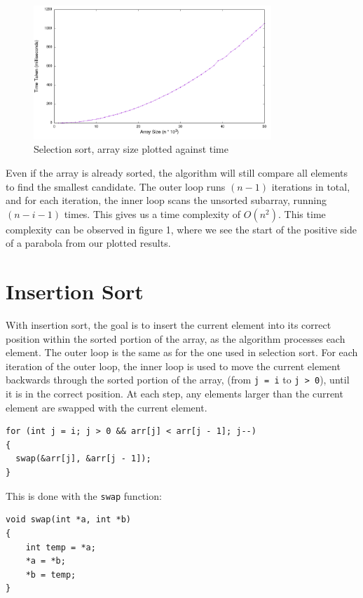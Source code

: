 \documentclass[a4paper,11pt]{article}
\begin{document}
\begin{figure}[h!]
  \centering
  \includegraphics[width=0.8\textwidth]{SelectionSort_plot}
  \caption{Selection sort, array size plotted against time}
  \label{fig:SelectionSort_plot}
\end{figure}

Even if the array is already sorted, the algorithm will still compare all elements to find the smallest candidate.
The outer loop runs $(n - 1)$ iterations in total, and for each iteration, the inner loop scans the unsorted subarray,
running $(n - i - 1)$ times.
This gives us a time complexity of $O(n^2)$.
This time complexity can be observed in figure 1, where we see the start of the positive side of a parabola from our plotted results.

\section*{Insertion Sort}
With insertion sort, the goal is to insert the current element into its correct position within the sorted portion of the array,
as the algorithm processes each element.
The outer loop is the same as for the one used in selection sort.
For each iteration of the outer loop, the inner loop is used to move the current element backwards through the sorted portion of the array,
(from \texttt{j = i} to \texttt{j > 0}), until it is in the correct position.
At each step, any elements larger than the current element are swapped with the current element.

\begin{verbatim}
for (int j = i; j > 0 && arr[j] < arr[j - 1]; j--)
{
  swap(&arr[j], &arr[j - 1]);
}
\end{verbatim}

This is done with the \texttt{swap} function:

\begin{verbatim}
void swap(int *a, int *b)
{
    int temp = *a;
    *a = *b;
    *b = temp;
}
\end{verbatim}
\end{document}
